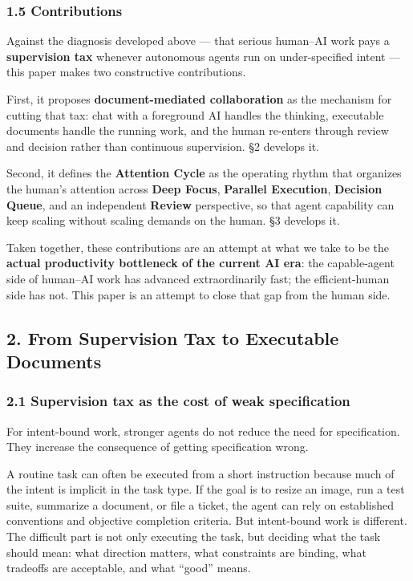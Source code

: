 \documentclass[
  nonatbib,
  preprint]{article}
\begin{document}
\subsubsection{1.5 Contributions}\label{contributions}

Against the diagnosis developed above --- that serious human--AI work
pays a \textbf{supervision tax} whenever autonomous agents run on
under-specified intent --- this paper makes two constructive
contributions.

First, it proposes \textbf{document-mediated collaboration} as the
mechanism for cutting that tax: chat with a foreground AI handles the
thinking, executable documents handle the running work, and the human
re-enters through review and decision rather than continuous
supervision. §2 develops it.

Second, it defines the \textbf{Attention Cycle} as the operating rhythm
that organizes the human's attention across \textbf{Deep Focus},
\textbf{Parallel Execution}, \textbf{Decision Queue}, and an independent
\textbf{Review} perspective, so that agent capability can keep scaling
without scaling demands on the human. §3 develops it.

Taken together, these contributions are an attempt at what we take to be
the \textbf{actual productivity bottleneck of the current AI era}: the
capable-agent side of human--AI work has advanced extraordinarily fast;
the efficient-human side has not. This paper is an attempt to close that
gap from the human side.

\subsection{\texorpdfstring{\textbf{2. From Supervision Tax to
Executable
Documents}}{2. From Supervision Tax to Executable Documents}}\label{from-supervision-tax-to-executable-documents}

\subsubsection{\texorpdfstring{\textbf{2.1 Supervision tax as the cost
of weak
specification}}{2.1 Supervision tax as the cost of weak specification}}\label{supervision-tax-as-the-cost-of-weak-specification}

For intent-bound work, stronger agents do not reduce the need for
specification. They increase the consequence of getting specification
wrong.

A routine task can often be executed from a short instruction because
much of the intent is implicit in the task type. If the goal is to
resize an image, run a test suite, summarize a document, or file a
ticket, the agent can rely on established conventions and objective
completion criteria. But intent-bound work is different. The difficult
part is not only executing the task, but deciding what the task should
mean: what direction matters, what constraints are binding, what
tradeoffs are acceptable, and what ``good'' means.
\end{document}
